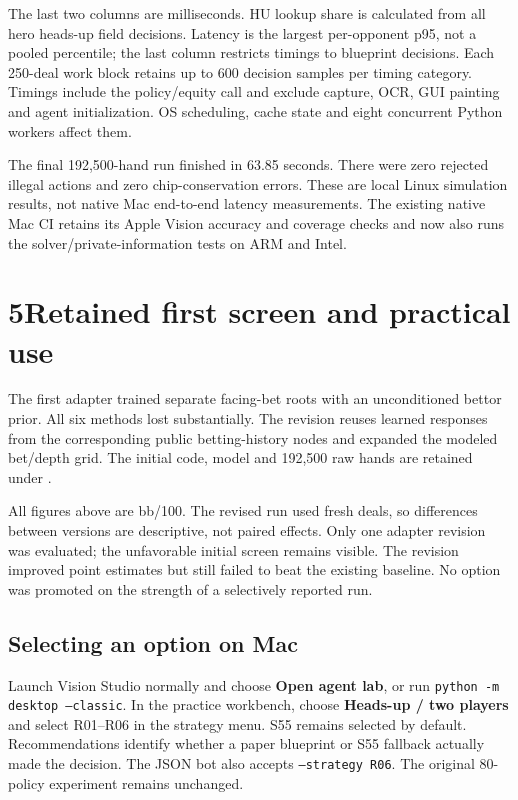 \documentclass[10pt,letterpaper]{article}
\begin{document}
The last two columns are milliseconds. HU lookup share is calculated from all
hero heads-up field decisions. Latency is the
largest per-opponent p95, not a pooled percentile; the last column restricts
timings to blueprint decisions. Each 250-deal work block retains up to 600
decision samples per timing category. Timings include the policy/equity call
and exclude capture, OCR, GUI painting and agent initialization. OS scheduling,
cache state and eight concurrent Python workers affect them.

The final 192,500-hand run finished in 63.85 seconds. There were zero rejected
illegal actions and zero chip-conservation errors. These are local Linux
simulation results, not native Mac end-to-end latency measurements. The existing
native Mac CI retains its Apple Vision accuracy and coverage checks and now
also runs the solver/private-information tests on ARM and Intel.

\newpage
\section*{5\quad Retained first screen and practical use}
The first adapter trained separate facing-bet roots with an unconditioned
bettor prior. All six methods lost substantially. The revision reuses learned
responses from the corresponding public betting-history nodes and expanded
the modeled bet/depth grid. The initial code, model and 192,500 raw hands are
retained under .

\begin{center}\small\end{center}
All figures above are bb/100. The revised run used fresh deals, so differences
between versions are descriptive, not paired effects. Only one adapter
revision was evaluated; the unfavorable initial screen remains visible. The
revision improved point estimates but still failed to beat the existing
baseline. No option was promoted on the strength of a selectively reported run.

\subsection*{Selecting an option on Mac}
Launch Vision Studio normally and choose \textbf{Open agent lab}, or run
\texttt{python -m desktop --classic}. In the practice workbench, choose
\textbf{Heads-up / two players} and select R01--R06 in the strategy menu.
S55 remains selected by default. Recommendations identify whether a paper
blueprint or S55 fallback actually made the decision. The JSON bot also accepts
\texttt{--strategy R06}. The original 80-policy experiment remains unchanged.
\end{document}
